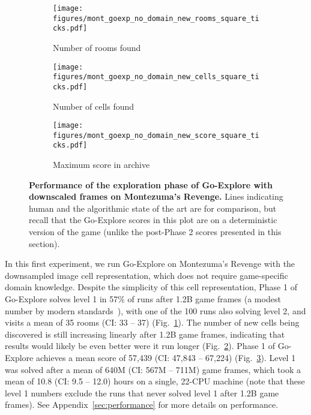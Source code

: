 \documentclass{article}
\newcommand{\pivotci}[2]{(CI: #1 -- #2)}  \newcommand{\percci}[2]{}  \newcommand{\tpivotci}[2]{(#1 -- #2)}  \newcommand{\tpercci}[2]{}  \newcommand{\na}[0]{-}
\begin{document}
\begin{figure}[htb]
    \begin{subfigure}[t]{.33\textwidth}
        \centering
        \texttt{[image: figures/mont\_goexp\_no\_domain\_new\_rooms\_square\_ticks.pdf]}
        \caption{Number of rooms found}
        \label{fig:mont_no_domain_room}
    \end{subfigure}
    \begin{subfigure}[t]{.33\textwidth}
        \centering
        \texttt{[image: figures/mont\_goexp\_no\_domain\_new\_cells\_square\_ticks.pdf]}
        \caption{Number of cells found}
        \label{fig:mont_no_domain_cell}
    \end{subfigure}
    \begin{subfigure}[t]{.33\textwidth}
        \centering
        \texttt{[image: figures/mont\_goexp\_no\_domain\_new\_score\_square\_ticks.pdf]}
        \caption{Maximum score in archive}
        \label{fig:mont_no_domain_score}
    \end{subfigure}
    \caption{\textbf{Performance of the exploration phase of Go-Explore with downscaled frames on Montezuma's Revenge.} Lines indicating human and the algorithmic state of the art are for comparison, but recall that the Go-Explore scores in this plot are on a deterministic version of the game (unlike the post-Phase 2 scores presented in this section).}
    \label{fig:mont_no_domain_overall}
\end{figure}

In this first experiment, we run Go-Explore on Montezuma's Revenge with the downsampled image cell representation, which does not require game-specific domain knowledge. Despite the simplicity of this cell representation, Phase 1 of Go-Explore solves level 1 in 57\% of runs after 1.2B game frames (a modest number by modern standards~\cite{horgan:apexdqn2018,espeholt:impala2018}), with one of the 100 runs also solving level 2, and visits a mean of 35 rooms \pivotci{33}{37}\percci{33}{38}
(Fig.~\ref{fig:mont_no_domain_room}). The number of new cells being discovered is still increasing linearly after 1.2B game frames, indicating that results would likely be even better were it run longer (Fig.~\ref{fig:mont_no_domain_cell}). Phase 1 of Go-Explore achieves a mean score of 57,439 \pivotci{47,843}{67,224}\percci{48,167}{67,364} (Fig.~\ref{fig:mont_no_domain_score}). Level 1 was solved after a mean of 640M \pivotci{567M}{711M}\percci{570M}{713M} game frames, which took a mean of 10.8 \pivotci{9.5}{12.0}\percci{9.5}{12.1} hours on a single, 22-CPU machine (note that these level 1 numbers exclude the runs that never solved level 1 after 1.2B game frames). See Appendix~\ref{sec:performance} for more details on performance.
\end{document}
